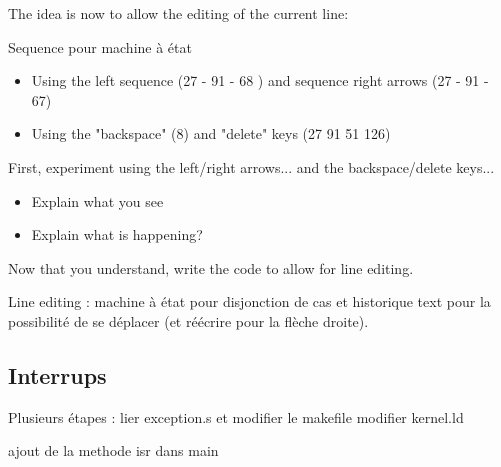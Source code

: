 \documentclass[10]{article}
\begin{document}
The idea is now to allow the editing of the current line:

Sequence pour machine à état 
\begin{itemize}
\item Using the left sequence (27 - 91 - 68 ) and sequence right arrows (27 - 91 - 67)
\item Using the "backspace" (8) and "delete" keys  (27 91  51 126)
\end{itemize}

First, experiment using the left/right arrows...
and the backspace/delete keys... 

\begin{itemize}
\item Explain what you see
\item Explain what is happening?
\end{itemize}

Now that you understand, write the code to allow for line editing.

Line editing : machine à état pour disjonction de cas et historique text pour la possibilité de se déplacer (et réécrire pour la flèche droite).

\subsection{Interrups}

Plusieurs étapes :
lier exception.s et modifier le makefile
modifier kernel.ld

ajout de la methode isr dans main 
\end{document}
